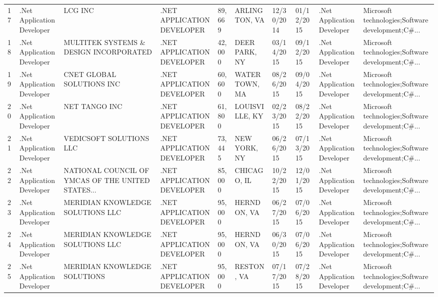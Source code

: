 \begin{table}[h!]
{\begin{tabular}{llllllllll}
	17 &  .Net Application Developer &                                            LCG INC &  .NET APPLICATION DEVELOPER &      89,669 &       ARLINGTON, VA &  12/30/2014 &  01/12/2015 &  .Net Application Developer &  Microsoft technologies;Software development;C\#... \\
	18 &  .Net Application Developer &             MULTITEK SYSTEMS \& DESIGN INCORPORATED &  .NET APPLICATION DEVELOPER &      42,000 &       DEER PARK, NY &  03/14/2015 &  09/12/2015 &  .Net Application Developer &  Microsoft technologies;Software development;C\#... \\
	19 &  .Net Application Developer &                          CNET GLOBAL SOLUTIONS INC &  .NET APPLICATION DEVELOPER &      60,600 &       WATERTOWN, MA &  08/26/2015 &  09/04/2015 &  .Net Application Developer &  Microsoft technologies;Software development;C\#... \\
	20 &  .Net Application Developer &                                      NET TANGO INC &  .NET APPLICATION DEVELOPER &      61,800 &      LOUISVILLE, KY &  02/23/2015 &  08/22/2015 &  .Net Application Developer &  Microsoft technologies;Software development;C\#... \\
	21 &  .Net Application Developer &                            VEDICSOFT SOLUTIONS LLC &  .NET APPLICATION DEVELOPER &      73,445 &        NEW YORK, NY &  06/26/2015 &  07/13/2015 &  .Net Application Developer &  Microsoft technologies;Software development;C\#... \\
	22 &  .Net Application Developer &  NATIONAL COUNCIL OF YMCAS OF THE UNITED STATES... &  .NET APPLICATION DEVELOPER &      85,000 &         CHICAGO, IL &  10/22/2015 &  12/01/2015 &  .Net Application Developer &  Microsoft technologies;Software development;C\#... \\
	23 &  .Net Application Developer &                   MERIDIAN KNOWLEDGE SOLUTIONS LLC &  .NET APPLICATION DEVELOPER &      95,000 &         HERNDON, VA &  06/27/2015 &  07/06/2015 &  .Net Application Developer &  Microsoft technologies;Software development;C\#... \\
	24 &  .Net Application Developer &                   MERIDIAN KNOWLEDGE SOLUTIONS LLC &  .NET APPLICATION DEVELOPER &      95,000 &         HERNDON, VA &  06/30/2015 &  07/06/2015 &  .Net Application Developer &  Microsoft technologies;Software development;C\#... \\
	25 &  .Net Application Developer &                       MERIDIAN KNOWLEDGE SOLUTIONS &  .NET APPLICATION DEVELOPER &      95,000 &          RESTON, VA &  07/17/2015 &  07/28/2015 &  .Net Application Developer &  Microsoft technologies;Software development;C\#... \\

\end{tabular}}
\end{table}
